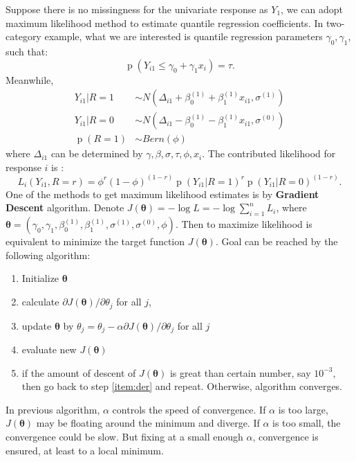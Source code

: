 \documentclass[12pt]{article}
\DeclareMathOperator{\pr}{p}
\begin{document}
Suppose there is no missingness for the univariate response as $Y_1$,
we can adopt maximum likelihood method to estimate quantile regression
coefficients. In two-category example, what we are interested is
quantile regression parameters $\gamma_0, \gamma_{1}$, such that:
\begin{displaymath}
  \pr (Y_{i1} \leq \gamma_0 + \gamma_1x_i) = \tau.
\end{displaymath}
Meanwhile,
\begin{align*}
  Y_{i1} | R = 1 & \sim N(\Delta_{i1} + \beta_0^{(1)} + \beta_1^{(1)}x_{i1}, \sigma^{(1)}) \\
  Y_{i1} | R = 0 & \sim N(\Delta_{i1} - \beta_0^{(1)} - \beta_1^{(1)}x_{i1}, \sigma^{(0)}) \\
  \pr (R = 1) & \sim Bern(\phi)
\end{align*}
where $\Delta_{i1}$ can be determined by $\gamma, \beta, \sigma, \tau,
\phi, x_i$. The contributed likelihood for response $i$ is :
\begin{equation}
  \label{eq:emp}
  L_i(Y_{i1}, R = r) = \phi^r(1-\phi)^{(1-r)}\pr \left( Y_{i1}|R = 1 \right)^r \pr \left( Y_{i1}|R = 0 \right)^{(1-r)}.
\end{equation}
One of the methods to get maximum likelihood estimates is by
\textbf{Gradient Descent} algorithm. Denote $J(\bm \theta) = - \log L
= - \log \sum_{i = 1}^n L_i$, where $\bm \theta = (\gamma_0, \gamma_1,
\beta_0^{(1)}, \beta_1^{(1)}, \sigma^{(1)}, \sigma^{(0)}, \phi)$.
Then to maximize likelihood is equivalent to minimize the target
function $J(\bm \theta)$. Goal can be reached by the following
algorithm:
\begin{enumerate}
\item Initialize $\bm \theta$
\item \label{item:der} calculate $\partial J(\bm \theta) / \partial
  \theta_j$ for all $j$,
\item update $\bm \theta$ by $\theta_j = \theta_j - \alpha \partial
  J(\bm \theta) / \partial \theta_j$ for all $j$
\item evaluate new $J(\bm \theta)$
\item if the amount of descent of $J ( \bm \theta)$ is great than
  certain number, say $10^{-3}$, then go back to step \ref{item:der}
  and repeat. Otherwise, algorithm converges.
\end{enumerate}
In previous algorithm, $\alpha$ controls the speed of convergence. If
$\alpha$ is too large, $J(\bm \theta)$ may be floating around the
minimum and diverge. If $\alpha$ is too small, the convergence could
be slow. But fixing at a small enough $\alpha$, convergence is
ensured, at least to a local minimum.
\end{document}
